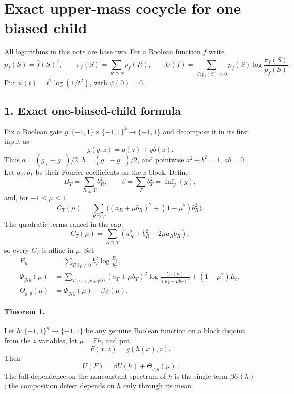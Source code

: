 \section*{Exact upper-mass cocycle for one biased child}

All logarithms in this note are base two.  For a Boolean function $f$ write
\[
 p_f(S)=\widehat f(S)^2,\qquad
 \pi_f(S)=\sum_{R\supseteq S}p_f(R),\qquad
 U(f)=\sum_{S:p_f(S)>0}p_f(S)\log\frac{\pi_f(S)}{p_f(S)}.
\]
Put $\psi(t)=t^2\log(1/t^2)$, with $\psi(0)=0$.

\subsection*{1. Exact one-biased-child formula}

Fix a Boolean gate $g:\{-1,1\}\times\{-1,1\}^k\to\{-1,1\}$ and
decompose it in its first input as
\[
 g(y,z)=a(z)+y b(z).
\]
Thus $a=(g_++g_-)/2$, $b=(g_+-g_-)/2$, and pointwise
$a^2+b^2=1$, $ab=0$.  Let $a_T,b_T$ be their Fourier coefficients on
the $z$ block.  Define
\[
 B_T=\sum_{R\supseteq T}b_R^2,
 \qquad \beta=\sum_Tb_T^2=\operatorname{Inf}_y(g),
\]
and, for $-1\le\mu\le1$,
\[
 C_T(\mu)=\sum_{R\supseteq T}
 \bigl((a_R+\mu b_R)^2+(1-\mu^2)b_R^2\bigr).
\]
The quadratic terms cancel in the cap:
\[
 C_T(\mu)=\sum_{R\supseteq T}(a_R^2+b_R^2+2\mu a_Rb_R),       \tag{1}
\]
so every $C_T$ is affine in $\mu$.  Set
\begin{align*}
 E_b&=\sum_{T:b_T\ne0}b_T^2\log\frac{B_T}{b_T^2},\\
 \Phi_{g,y}(\mu)
 &=\sum_{T:a_T+\mu b_T\ne0}(a_T+\mu b_T)^2
       \log\frac{C_T(\mu)}{(a_T+\mu b_T)^2}
   +(1-\mu^2)E_b,                                               \tag{2}\\
 \Theta_{g,y}(\mu)&=\Phi_{g,y}(\mu)-\beta\psi(\mu).            \tag{3}
\end{align*}

\paragraph{Theorem 1.}
Let $h:\{-1,1\}^n\to\{-1,1\}$ be any genuine Boolean function on a
block disjoint from the $z$ variables, let $\mu=\mathbb Eh$, and put
\[
 F(x,z)=g(h(x),z).
\]
Then
\[
 \boxed{\ U(F)=\beta U(h)+\Theta_{g,y}(\mu)\ }.                 \tag{4}
\]
The full dependence on the nonconstant spectrum of $h$ is the single term
$\beta U(h)$; the composition defect depends on $h$ only through its mean.

